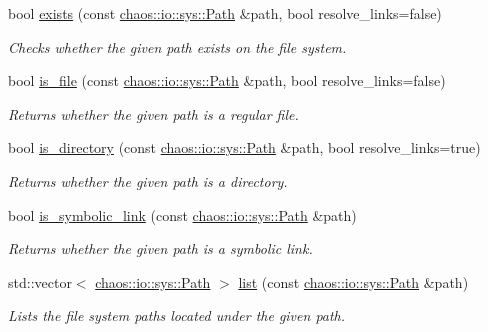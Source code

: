 \begin{DoxyCompactItemize}
\item 
bool \hyperlink{namespacechaos_1_1io_1_1sys_ae8f4abc1388c24e0ce7a655a50cd0212}{exists} (const \hyperlink{classchaos_1_1io_1_1sys_1_1_path}{chaos\-::io\-::sys\-::\-Path} \&path, bool resolve\-\_\-links=false)
\begin{DoxyCompactList}\small\item\em Checks whether the given path exists on the file system. \end{DoxyCompactList}\item 
bool \hyperlink{namespacechaos_1_1io_1_1sys_a2afa9dc6f049b03265731be671dbcb17}{is\-\_\-file} (const \hyperlink{classchaos_1_1io_1_1sys_1_1_path}{chaos\-::io\-::sys\-::\-Path} \&path, bool resolve\-\_\-links=false)
\begin{DoxyCompactList}\small\item\em Returns whether the given path is a regular file. \end{DoxyCompactList}\item 
bool \hyperlink{namespacechaos_1_1io_1_1sys_ad48945ad68ee4c84a37240ebc6b5a167}{is\-\_\-directory} (const \hyperlink{classchaos_1_1io_1_1sys_1_1_path}{chaos\-::io\-::sys\-::\-Path} \&path, bool resolve\-\_\-links=true)
\begin{DoxyCompactList}\small\item\em Returns whether the given path is a directory. \end{DoxyCompactList}\item 
bool \hyperlink{namespacechaos_1_1io_1_1sys_ac47b8476aea536b08a1c7a34b4e7e28c}{is\-\_\-symbolic\-\_\-link} (const \hyperlink{classchaos_1_1io_1_1sys_1_1_path}{chaos\-::io\-::sys\-::\-Path} \&path)
\begin{DoxyCompactList}\small\item\em Returns whether the given path is a symbolic link. \end{DoxyCompactList}\item 
std\-::vector$<$ \hyperlink{classchaos_1_1io_1_1sys_1_1_path}{chaos\-::io\-::sys\-::\-Path} $>$ \hyperlink{namespacechaos_1_1io_1_1sys_a21398064d60d0d4ac225a2c5004adf06}{list} (const \hyperlink{classchaos_1_1io_1_1sys_1_1_path}{chaos\-::io\-::sys\-::\-Path} \&path)
\begin{DoxyCompactList}\small\item\em Lists the file system paths located under the given path. \end{DoxyCompactList}\item 

\end{DoxyCompactItemize}
